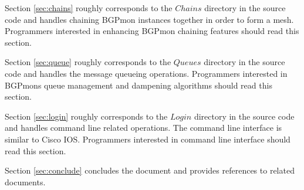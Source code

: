 Section \ref{sec:chains} roughly corresponds to the $Chains$ directory in the source code and handles chaining BGPmon instances together in order to form a mesh.     Programmers interested in enhancing BGPmon chaining features should read this section.

Section \ref{sec:queue} roughly corresponds to the $Queues$ directory in the source code and handles the message queueing operations.   Programmers interested in BGPmons queue management and dampening algorithms should read this section.

Section \ref{sec:login} roughly corresponds to the $Login$ directory in the source code and handles command line related operations. The command line interface is similar to Cisco IOS.  Programmers interested in command line interface should read this section.

Section \ref{sec:conclude} concludes the document and provides references to related documents.
